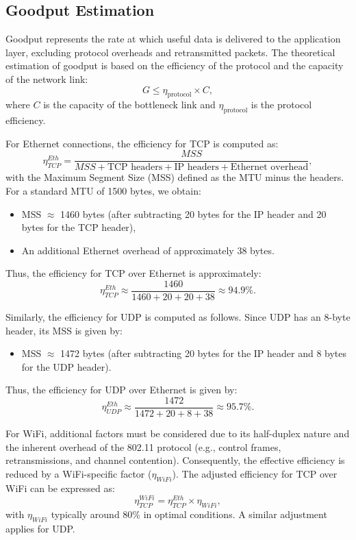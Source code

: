     \subsection{Goodput Estimation} \label{subsec:goodput-estimation}

        Goodput represents the rate at which useful data is delivered to the application layer, excluding protocol overheads and retransmitted packets. 
        The theoretical estimation of goodput is based on the efficiency of the protocol and the capacity of the network link:
        \[
        G \leq \eta_{\text{protocol}} \times C,
        \]
        where \(C\) is the capacity of the bottleneck link and \(\eta_{\text{protocol}}\) is the protocol efficiency.

        \noindent For Ethernet connections, the efficiency for TCP is computed as:
        \[
        \eta_{TCP}^{Eth} = \frac{MSS}{MSS + \text{TCP headers} + \text{IP headers} + \text{Ethernet overhead}},
        \]
        with the Maximum Segment Size (MSS) defined as the MTU minus the headers. For a standard MTU of 1500 bytes, we obtain:

        \begin{itemize}
            \item MSS \(\approx\) 1460 bytes (after subtracting 20 bytes for the IP header and 20 bytes for the TCP header),
            \item An additional Ethernet overhead of approximately 38 bytes.
        \end{itemize}

        \noindent Thus, the efficiency for TCP over Ethernet is approximately:
        \[
        \eta_{TCP}^{Eth} \approx \frac{1460}{1460 + 20 + 20 + 38} \approx 94.9\%.
        \]

        \noindent Similarly, the efficiency for UDP is computed as follows. Since UDP has an 8-byte header, its MSS is given by:

        \begin{itemize}
            \item MSS \(\approx\) 1472 bytes (after subtracting 20 bytes for the IP header and 8 bytes for the UDP header).
        \end{itemize}

        \noindent Thus, the efficiency for UDP over Ethernet is given by:
        \[
        \eta_{UDP}^{Eth} \approx \frac{1472}{1472 + 20 + 8 + 38} \approx 95.7\%.
        \]

        \noindent For WiFi, additional factors must be considered due to its half-duplex nature and the inherent overhead of the 802.11 protocol (e.g., control frames, retransmissions, and channel contention). 
        Consequently, the effective efficiency is reduced by a WiFi-specific factor (\(\eta_{WiFi}\)). 
        The adjusted efficiency for TCP over WiFi can be expressed as:
        \[
        \eta_{TCP}^{WiFi} = \eta_{TCP}^{Eth} \times \eta_{WiFi},
        \]
        with \(\eta_{WiFi}\) typically around 80\% in optimal conditions. A similar adjustment applies for UDP.

